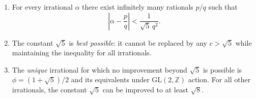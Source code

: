 \begin{theorem}
\label{thm:hurwitz}
\begin{enumerate}
  \item For every irrational $\alpha$ there exist
        infinitely many rationals $p/q$ such that
        \begin{equation}\label{eq:hurwitz-ineq}
          \left|\alpha - \frac{p}{q}\right|
          < \frac{1}{\sqrt{5}\,q^2}.
        \end{equation}
  \item The constant $\sqrt{5}$ is \emph{best possible}:
        it cannot be replaced by any $c > \sqrt{5}$
        while maintaining the inequality for all
        irrationals.
  \item The \emph{unique} irrational for which
        no improvement beyond $\sqrt{5}$ is possible
        is $\phi = (1+\sqrt{5})/2$ and its
        equivalents under
        $\mathrm{GL}(2,\mathbb{Z})$ action.
        For all other irrationals, the constant
        $\sqrt{5}$ can be improved to at least
        $\sqrt{8}$.
\end{enumerate}
\end{theorem}

